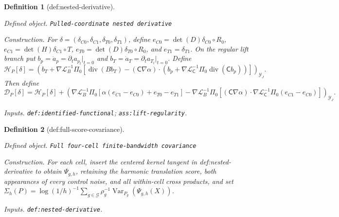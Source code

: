\documentclass{article}
\newtheorem{definition}{Definition}
\begin{document}
\begin{definition}[def:nested-derivative]\label{def:nested-derivative}
\par\smallskip\noindent\emph{Defined object.} \texttt{Pulled-\allowbreak{}coordinate nested derivative}
\par\smallskip\noindent\emph{Construction.} For \(\delta=(\delta_{C0},\delta_{C1},\delta_{T0},\delta_{T1})\), define \(e_{C0}=\det(D)\delta_{C0}\circ R_0\), \(e_{C1}=\det(H)\delta_{C1}\circ T\), \(e_{T0}=\det(D)\delta_{T0}\circ R_0\), and \(e_{T1}=\delta_{T1}\).  On the regular lift branch put \(b_p=\dot a_p=\partial_ta_{p_t}|_{t=0}\) and \(b_T=\dot a_T=\partial_ta_{T_t}|_{t=0}\).  Define
\[
\mathcal H_P[\delta]
=\left(
b_T+\nabla\mathcal L_B^{-1}\Pi_0\!\left[
\operatorname{div}(B b_T)
-(\mathsf C\nabla\alpha)\cdot\left(
b_p+\nabla\mathcal L_{\mathsf C}^{-1}\Pi_0
\operatorname{div}(\mathsf C b_p)
\right)
\right]
\right)_{\mathcal Y_J}.
\]
Then define
\[
\mathcal D_P[\delta]
=\mathcal H_P[\delta]
+\left(
\nabla\mathcal L_B^{-1}\Pi_0
[\alpha(e_{C1}-e_{C0})+e_{T0}-e_{T1}]
-\nabla\mathcal L_B^{-1}\Pi_0\!\left[
(\mathsf C\nabla\alpha)\cdot
\nabla\mathcal L_{\mathsf C}^{-1}\Pi_0(e_{C1}-e_{C0})
\right]
\right)_{\mathcal Y_J}.
\]
\par\smallskip\noindent\emph{Inputs.} \texttt{def:\allowbreak{}identified-\allowbreak{}functional}; \texttt{ass:\allowbreak{}lift-\allowbreak{}regularity}.
\end{definition}

\begin{definition}[def:full-score-covariance]\label{def:full-score-covariance}
\par\smallskip\noindent\emph{Defined object.} \texttt{Full four-\allowbreak{}cell finite-\allowbreak{}bandwidth covariance}
\par\smallskip\noindent\emph{Construction.} For each cell, insert the centered kernel tangent in def:nested-derivative to obtain \(\Psi_{g,h}\), retaining the harmonic translation score, both appearances of every control noise, and all within-cell cross products, and set \(\Sigma_h(P)=\log(1/h)^{-1}\sum_{g\in\mathcal G}\rho_g^{-1}\operatorname{Var}_{P_g}(\Psi_{g,h}(X))\).
\par\smallskip\noindent\emph{Inputs.} \texttt{def:\allowbreak{}nested-\allowbreak{}derivative}.
\end{definition}
\end{document}
